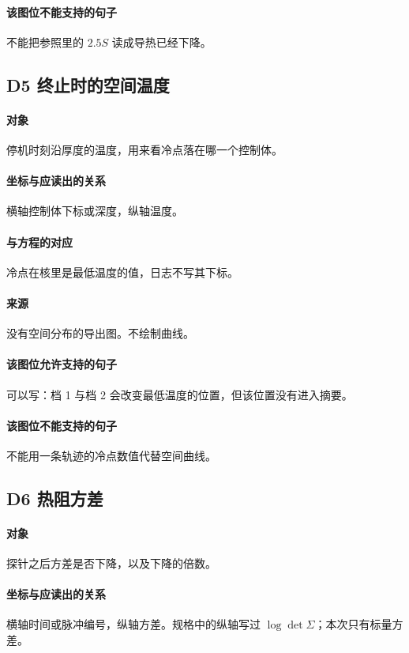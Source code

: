 \paragraph{该图位不能支持的句子}
不能把参照里的 $2.5S$ 读成导热已经下降。

\subsection{D5 终止时的空间温度}
\paragraph{对象}
停机时刻沿厚度的温度，用来看冷点落在哪一个控制体。

\paragraph{坐标与应读出的关系}
横轴控制体下标或深度，纵轴温度。

\paragraph{与方程的对应}
冷点在核里是最低温度的值，日志不写其下标。

\paragraph{来源}
没有空间分布的导出图。不绘制曲线。

\paragraph{该图位允许支持的句子}
可以写：档 1 与档 2 会改变最低温度的位置，但该位置没有进入摘要。

\paragraph{该图位不能支持的句子}
不能用一条轨迹的冷点数值代替空间曲线。

\subsection{D6 热阻方差}
\paragraph{对象}
探针之后方差是否下降，以及下降的倍数。

\paragraph{坐标与应读出的关系}
横轴时间或脉冲编号，纵轴方差。规格中的纵轴写过 $\log\det\Sigma$；本次只有标量方差。

